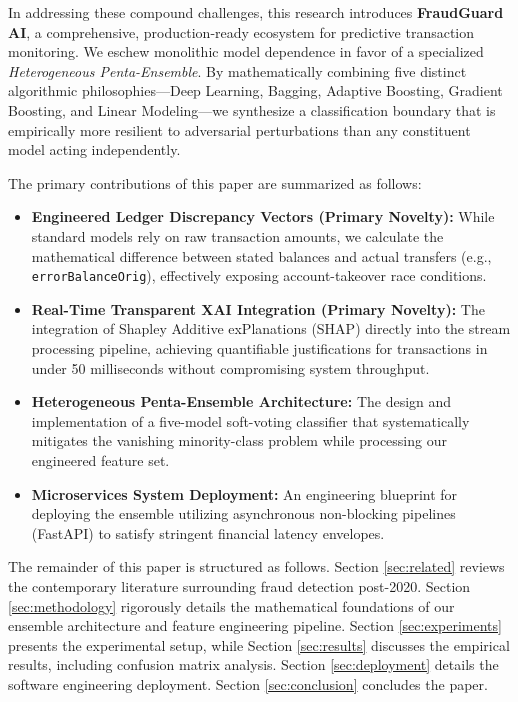 \documentclass[conference]{IEEEtran}
\begin{document}
In addressing these compound challenges, this research introduces \textbf{FraudGuard AI}, a comprehensive, production-ready ecosystem for predictive transaction monitoring. We eschew monolithic model dependence in favor of a specialized \textit{Heterogeneous Penta-Ensemble}. By mathematically combining five distinct algorithmic philosophies—Deep Learning, Bagging, Adaptive Boosting, Gradient Boosting, and Linear Modeling—we synthesize a classification boundary that is empirically more resilient to adversarial perturbations than any constituent model acting independently.

The primary contributions of this paper are summarized as follows:
\begin{itemize}
    \item \textbf{Engineered Ledger Discrepancy Vectors (Primary Novelty):} While standard models rely on raw transaction amounts, we calculate the mathematical difference between stated balances and actual transfers (e.g., \texttt{errorBalanceOrig}), effectively exposing account-takeover race conditions.
    \item \textbf{Real-Time Transparent XAI Integration (Primary Novelty):} The integration of Shapley Additive exPlanations (SHAP) directly into the stream processing pipeline, achieving quantifiable justifications for transactions in under 50 milliseconds without compromising system throughput.
    \item \textbf{Heterogeneous Penta-Ensemble Architecture:} The design and implementation of a five-model soft-voting classifier that systematically mitigates the vanishing minority-class problem while processing our engineered feature set.
    \item \textbf{Microservices System Deployment:} An engineering blueprint for deploying the ensemble utilizing asynchronous non-blocking pipelines (FastAPI) to satisfy stringent financial latency envelopes.
\end{itemize}

The remainder of this paper is structured as follows. Section \ref{sec:related} reviews the contemporary literature surrounding fraud detection post-2020. Section \ref{sec:methodology} rigorously details the mathematical foundations of our ensemble architecture and feature engineering pipeline. Section \ref{sec:experiments} presents the experimental setup, while Section \ref{sec:results} discusses the empirical results, including confusion matrix analysis. Section \ref{sec:deployment} details the software engineering deployment. Section \ref{sec:conclusion} concludes the paper.
\end{document}
